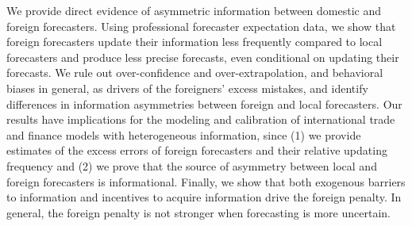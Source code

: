 

We provide direct evidence of asymmetric information between domestic and foreign forecasters. Using professional forecaster expectation data, we show that foreign forecasters update their information less frequently compared to local forecasters and produce less precise forecasts, even conditional on updating their forecasts. We rule out over-confidence and over-extrapolation, and behavioral biases in general, as drivers of the foreigners' excess mistakes, and identify differences in information asymmetries between foreign and local forecasters. Our results have implications for the modeling and calibration of international trade and finance models with heterogeneous information, since (1) we provide estimates of the excess errors of foreign forecasters and their relative updating frequency and (2) we prove that the source of asymmetry between local and foreign forecasters is informational. Finally, we show that both exogenous barriers to information and incentives to acquire information drive the foreign penalty. In general, the foreign penalty is not stronger when forecasting is more uncertain.


